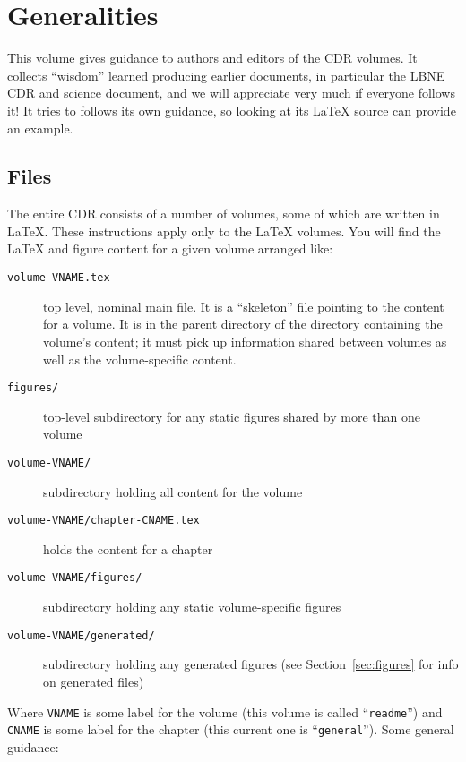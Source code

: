 \chapter{Generalities}
\label{ch:generalities}

This volume gives guidance to authors and editors of the CDR volumes. It collects ``wisdom'' learned 
producing earlier documents, in particular the LBNE CDR and science document, and we will appreciate 
very much if everyone follows it!  It tries to follows its own guidance, so looking at its \LaTeX{} source can 
provide an example.  
\section{Files}
\label{sec:files}

The entire CDR consists of a number of volumes, some of which are written in \LaTeX{}. These instructions apply only to the \LaTeX{} volumes.  You will find the \LaTeX{} and figure content for a given volume arranged like:

\begin{description}
\item[\texttt{volume-VNAME.tex}] top level, nominal main file. It is a ``skeleton'' file pointing to the content for a volume.  It is in the parent directory of the directory 
containing the volume's content; it must pick up information shared between volumes as well as the 
volume-specific content.
\item[\texttt{figures/}] top-level subdirectory for any static figures shared by more than one volume
\item[\texttt{volume-VNAME/}] subdirectory holding all content for the volume
\item[\texttt{volume-VNAME/chapter-CNAME.tex}] holds the content for a chapter
\item[\texttt{volume-VNAME/figures/}] subdirectory holding any static volume-specific figures
\item[\texttt{volume-VNAME/generated/}] subdirectory holding any generated figures (see Section~\ref{sec:figures} for info on generated files)
\end{description}

Where \texttt{VNAME} is some label for the volume (this volume is called ``\texttt{readme}'') and 
\texttt{CNAME} is some label for the chapter (this current one is ``\texttt{general}'').  
Some general guidance:

